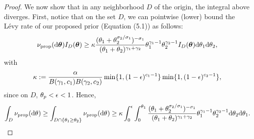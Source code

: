 \begin{proof}
    We now show that in any neighborhood $D$ of the origin, the integral above diverges.  First, notice that on the set $D$, we can pointwise (lower) bound the L\'{e}vy rate of our proposed prior (Equation (5.1)) as follows:
    \[
    	\nu_{\mathrm{prop}}(\mathrm{d} \boldsymbol{\theta}) I_{D}(\boldsymbol{\theta}) \ge  \kappa \frac{(\theta_{1}+\theta_{2}^{\sigma_{2}/\sigma_{1}})^{-\sigma_{1}}}{(\theta_{1}+\theta_{2})^{\gamma_{1}+\gamma_{2}}}\theta_{1}^{\gamma_{1}-1}\theta_{2}^{\gamma_{2}-1} I_D(\boldsymbol{\theta}) \mathrm{d} \theta_{1} \mathrm{d} \theta_{2},
    \]
    with 
    \[
    	\kappa := \frac{\alpha}{B(\gamma_{1},c_{1})B(\gamma_{2},c_{2})} \min\{1, (1-\epsilon)^{c_{1}-1}\} \min\{ 1, (1-\epsilon)^{c_{2}-1}\},
    \]
    since on $D$, $\theta_{p} < \epsilon < 1$. Hence,
    \begin{align*}
       \int_D \ratemeasproposed(\de\vecvariantfreq{}) \ge \int_{D \cap \{\variantfreqperpop{1} \ge \variantfreqperpop{2} \}} \ratemeasproposed(\de\vecvariantfreq{})  
        \ge \kappa \int_0^{\epsilon} \int_0^{\variantfreqperpop{1}} \frac{(\variantfreqperpop{1}+\variantfreqperpop{2}^{\rate{2}/\rate{1}})^{-\rate{1}}}{(\variantfreqperpop{1}+\variantfreqperpop{2})^{\corr{1}+\corr{2}}}\variantfreqperpop{1}^{\corr{1}-1}\variantfreqperpop{2}^{\corr{2}-1} \de \variantfreqperpop{2} \de \variantfreqperpop{1}.
    \end{align*}


\end{proof}
